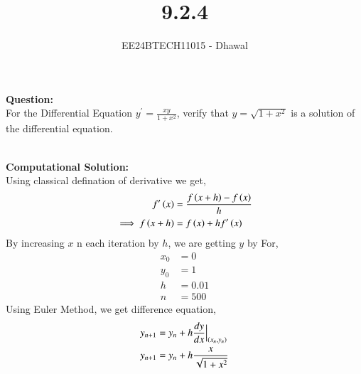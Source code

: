 \documentclass[journal]{IEEEtran}
\begin{document}

\vspace{3cm}

\title{9.2.4}
\author{EE24BTECH11015 - Dhawal}

{\let\newpage\relax\maketitle}

\renewcommand{\thefigure}{\theenumi}
\renewcommand{\thetable}{\theenumi}
\setlength{\intextsep}{10pt} %

\textbf{Question:}\\
For the Differential Equation $y^{\prime}=\frac{xy}{1+x^2}$, verify that $y=\sqrt{1+x^2}$ is a solution of the differential equation.

\\
\textbf{Computational Solution:}\\
Using classical defination of derivative we get,\\
\begin{align}
    f^{\prime}\left(x\right) &= \frac{f\left(x+h\right)-f\left(x\right)}{h}\\
    \implies f\left(x+h\right) &= f\left(x\right) + h f^{\prime}\left(x\right)
\end{align}
By increasing $x$ n each iteration by $h$, we are getting $y$ by 
For,
\begin{align}
x_0 &= 0\\
y_0 &= 1\\
h &= 0.01\\
n &= 500
\end{align}
Using Euler Method, we get difference equation,
\begin{align}
y_{n+1} &= y_n + h\frac{dy}{dx}\Big|_{\left(x_n,y_n\right)}\\
y_{n+1} &= y_n + h \frac{x}{\sqrt{1+x^2}}
\end{align}
\end{document}
